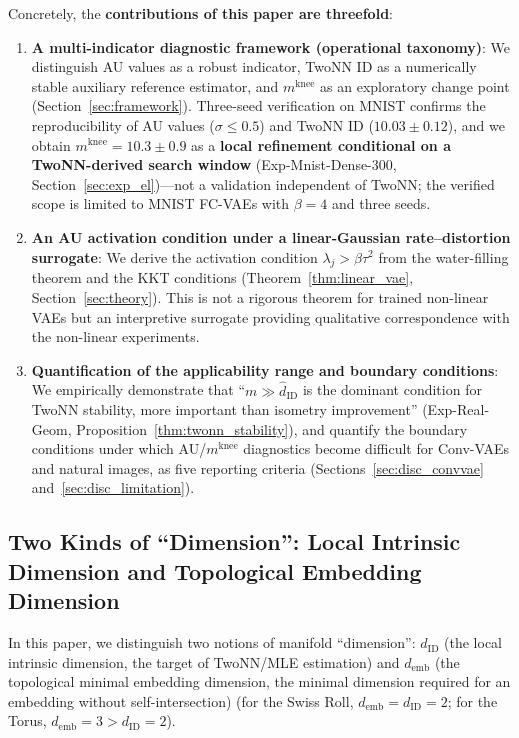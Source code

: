 \documentclass[make,article,submit,pdftex,moreauthors]{Definitions/mdpi}
\newcommand{\dID}{d_{\mathrm{ID}}}
\newcommand{\mknee}{m^{\mathrm{knee}}}
\newcommand{\demb}{d_{\mathrm{emb}}}
\newcommand{\hatdID}{\hat{d}_{\mathrm{ID}}}
\begin{document}
Concretely, the \textbf{contributions of this paper are threefold}:
\begin{enumerate}
  \item \textbf{A multi-indicator diagnostic framework (operational taxonomy)}:
        We distinguish AU values as a robust indicator, TwoNN ID as a numerically
        stable auxiliary reference estimator, and $\mknee$ as an exploratory
        change point (Section~\ref{sec:framework}).
        Three-seed verification on MNIST confirms the reproducibility of
        AU values ($\sigma \leq 0.5$) and TwoNN ID ($10.03 \pm 0.12$), and we
        obtain $\mknee = 10.3 \pm 0.9$ as a
        \textbf{local refinement conditional on a TwoNN-derived search window}
        (Exp-Mnist-Dense-300, Section~\ref{sec:exp_el})---not a validation
        independent of TwoNN; the verified scope is limited to MNIST FC-VAEs
        with $\beta = 4$ and three seeds.
  \item \textbf{An AU activation condition under a linear-Gaussian
        rate--distortion surrogate}:
        We derive the activation condition $\lambda_j > \beta\tau^2$ from the
        water-filling theorem and the KKT conditions
        (Theorem~\ref{thm:linear_vae}, Section~\ref{sec:theory}).
        This is not a rigorous theorem for trained non-linear VAEs but an
        interpretive surrogate providing qualitative correspondence with the
        non-linear experiments.
  \item \textbf{Quantification of the applicability range and boundary conditions}:
        We empirically demonstrate that ``$m \gg \hatdID$ is the dominant
        condition for TwoNN stability, more important than isometry improvement''
        (Exp-Real-Geom, Proposition~\ref{thm:twonn_stability}), and quantify the
        boundary conditions under which AU/$\mknee$ diagnostics become difficult
        for Conv-VAEs and natural images, as five reporting criteria
        (Sections~\ref{sec:disc_convvae} and~\ref{sec:disc_limitation}).
\end{enumerate}

\subsection{Two Kinds of ``Dimension'': Local Intrinsic Dimension and Topological Embedding Dimension}\label{sec:intro_dim}

In this paper, we distinguish two notions of manifold ``dimension'':
$\dID$ (the local intrinsic dimension, the target of TwoNN/MLE estimation) and
$\demb$ (the topological minimal embedding dimension, the minimal dimension
required for an embedding without self-intersection)
(for the Swiss Roll, $\demb = \dID = 2$; for the Torus, $\demb = 3 > \dID = 2$).
\end{document}
